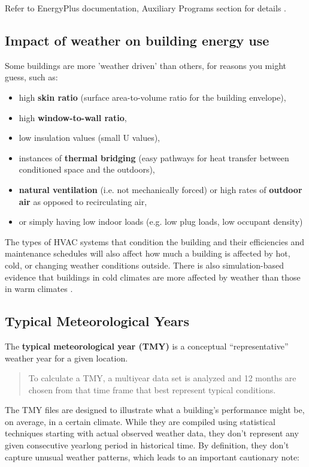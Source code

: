 \documentclass[10pt]{article}
\begin{document}
Refer to EnergyPlus documentation, Auxiliary Programs section for details \cite{EP9docs}.

\subsection{Impact of weather on building energy use}

Some buildings are more 'weather driven' than others, for reasons you might guess, such as: 
\begin{itemize}
    \setlength{\itemsep}{0pt}%
    \setlength{\parskip}{0pt}%
    \item high \textbf{skin ratio} (surface area-to-volume ratio for the building envelope),
    \item high \textbf{window-to-wall ratio},
    \item low insulation values (small U values),
    \item instances of \textbf{thermal bridging} (easy pathways for heat transfer between conditioned space and the outdoors),
    \item \textbf{natural ventilation} (i.e. not mechanically forced) or high rates of \textbf{outdoor air} as opposed to recirculating air,
    \item or simply having low indoor loads (e.g. low plug loads, low occupant density)
\end{itemize}

The types of HVAC systems that condition the building and their efficiencies and maintenance schedules will also affect how much a building is affected by hot, cold, or changing weather conditions outside. There is also simulation-based evidence that buildings in cold climates are more affected by weather than those in warm climates \cite{Hong2013-ti}.

\subsection{Typical Meteorological Years}

The \textbf{typical meteorological year (TMY)} is a conceptual ``representative'' weather year for a given location. 

\begin{quote}
To calculate a TMY, a multiyear data set is analyzed and 12 months are chosen from that time frame that best represent typical conditions. \cite{tmy-nsrdb}
\end{quote}

The TMY files are designed to illustrate what a building's performance might be, on average, in a certain climate. While they are compiled using statistical techniques starting with actual observed weather data, they don't represent any given consecutive yearlong period in historical time. By definition, they don't capture unusual weather patterns, which leads to an important cautionary note:
\end{document}
